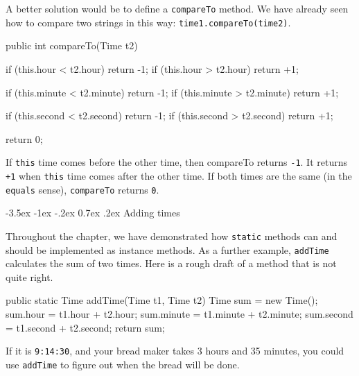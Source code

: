 \documentclass[12pt]{book}
\makeatletter
\theoremstyle{exercise}
\newcommand{\java}[1]{\verb"#1"}
\renewcommand{\section}{\@startsection {section}{1}{\z@}%
    {-3.5ex \@plus -1ex \@minus -.2ex}%
    {0.7ex \@plus.2ex}%
    {\normalfont\Large\bfseries}}
\newcommand{\java}[1]{\lstinline{#1}} %
\makeatother
\begin{document}
A better solution would be to define a \java{compareTo} method.
We have already seen how to compare two strings in this way: \java{time1.compareTo(time2)}.

\begin{code}
    public int compareTo(Time t2) {
        if (this.hour < t2.hour) return -1;
        if (this.hour > t2.hour) return +1;

        if (this.minute < t2.minute) return -1;
        if (this.minute > t2.minute) return +1;

        if (this.second < t2.second) return -1;
        if (this.second > t2.second) return +1;

        return 0;
    }
\end{code}

If \java{this} time comes before the other time, then compareTo returns \java{-1}.
It returns \java{+1} when \java{this} time comes after the other time.
If both times are the same (in the \java{equals} sense), \java{compareTo} returns \java{0}.


\section{Adding times}

Throughout the chapter, we have demonstrated how \java{static} methods can and should be implemented as instance methods.
As a further example, \java{addTime} calculates the sum of two times.
Here is a rough draft of a method that is not quite right.

\begin{code}
    public static Time addTime(Time t1, Time t2) {
        Time sum = new Time();
        sum.hour = t1.hour + t2.hour;
        sum.minute = t1.minute + t2.minute;
        sum.second = t1.second + t2.second;
        return sum;
    }
\end{code}


If it is {\tt 9:14:30}, and your bread maker takes 3 hours and 35 minutes, you could use \java{addTime} to figure out when the bread will be done.
\end{document}
